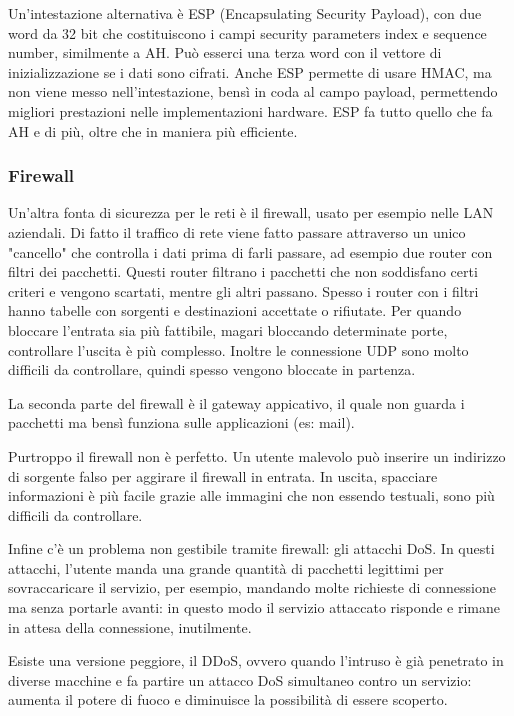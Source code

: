Un'intestazione alternativa è ESP (Encapsulating Security Payload), con due word da 32 bit che costituiscono i campi security parameters index e sequence number, similmente a AH.
Può esserci una terza word con il vettore di inizializzazione se i dati sono cifrati.
Anche ESP permette di usare HMAC, ma non viene messo nell'intestazione, bensì in coda al campo payload, permettendo migliori prestazioni nelle implementazioni hardware.
ESP fa tutto quello che fa AH e di più, oltre che in maniera più efficiente.

\subsubsection{Firewall} %
Un'altra fonta di sicurezza per le reti è il firewall, usato per esempio nelle LAN aziendali.
Di fatto il traffico di rete viene fatto passare attraverso un unico "cancello" che controlla i dati prima di farli passare,
ad esempio due router con filtri dei pacchetti.
Questi router filtrano i pacchetti che non soddisfano certi criteri e vengono scartati, mentre gli altri passano.
Spesso i router con i filtri hanno tabelle con sorgenti e destinazioni accettate o rifiutate.
Per quando bloccare l'entrata sia più fattibile, magari bloccando determinate porte, controllare l'uscita è più complesso.
Inoltre le connessione UDP sono molto difficili da controllare, quindi spesso vengono bloccate in partenza.

La seconda parte del firewall è il gateway appicativo, il quale non guarda i pacchetti ma bensì funziona sulle applicazioni (es: mail).

Purtroppo il firewall non è perfetto. Un utente malevolo può inserire un indirizzo di sorgente falso per aggirare il firewall in entrata.
In uscita, spacciare informazioni è più facile grazie alle immagini che non essendo testuali, sono più difficili da controllare.

Infine c'è un problema non gestibile tramite firewall: gli attacchi DoS. 
In questi attacchi, l'utente manda una grande quantità di pacchetti legittimi per sovraccaricare il servizio,
per esempio, mandando molte richieste di connessione ma senza portarle avanti: in questo modo il servizio attaccato risponde e rimane in attesa della connessione, inutilmente.

Esiste una versione peggiore, il DDoS, ovvero quando l'intruso è già penetrato in diverse macchine e fa partire un attacco DoS simultaneo contro un servizio:
aumenta il potere di fuoco e diminuisce la possibilità di essere scoperto.

